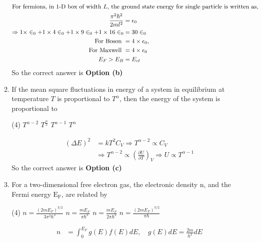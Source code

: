 \begin{enumerate}
	\begin{answer}
		\begin{align*}
		\intertext{For fermions, in 1-D box of width $L$, the ground state energy for single particle is written as,}
		\frac{\pi^{2} \hbar^{2}}{2 m l^{2}}&=\epsilon_{0}\\
		\Rightarrow 1 \times \in_{0}+1 \times 4 \in_{0}+1 \times 9 \in_{0}+1 \times 16 \in_{0}&=30 \in_{0}\\
		\text{ For Boson }&=4 \times \epsilon_{0},\\\text{ For Maxwell }&=4 \times \epsilon_{0}\\
		E_{F}>E_{B}&=E_{c l}
		\end{align*}
		So the correct answer is \textbf{Option (b)}
	\end{answer}
	\item If the mean square fluctuations in energy of a system in equilibrium at temperature $T$ is proportional to $T^{\alpha}$, then the energy of the system is proportional to
	{}
	\begin{tasks}(4)
		\task[\textbf{a.}] $T^{\alpha-2}$
		\task[\textbf{b.}] $T^{\frac{\alpha}{2}}$
		\task[\textbf{c.}] $T^{\alpha-1}$
		\task[\textbf{d.}] $T^{\alpha}$
	\end{tasks}
\begin{answer}
	\begin{align*}
	(\Delta E)^{2}&=k T^{2} C_{V} \Rightarrow T^{\alpha-2} \propto C_{V} \\&\Rightarrow T^{\alpha-2} \propto\left(\frac{\partial U}{\partial T}\right)_{V} \Rightarrow U \propto T^{\alpha-1}
	\end{align*}
	So the correct answer is \textbf{Option (c)}
\end{answer}
	\item For a two-dimensional free electron gas, the electronic density $\mathrm{n}$, and the Fermi energy $\mathrm{E}_{\mathrm{F}}$, are related by
	{}
	\begin{tasks}(4)
		\task[\textbf{a.}] $n=\frac{\left(2 m E_{F}\right)^{3 / 2}}{3 \pi^{2} \hbar^{3}}$
		\task[\textbf{b.}] $n=\frac{m E_{F}}{\pi \hbar^{2}}$
		\task[\textbf{c.}] $n=\frac{m E_{F}}{2 \pi \hbar^{2}}$
		\task[\textbf{d.}] $n=\frac{\left(2 m E_{F}\right)^{3 / 2}}{\pi \hbar}$
	\end{tasks}
	\begin{answer}
		\begin{align*}
		n&=\int_{0}^{E_{F}} g(E) f(E) d E, \quad g(E) d E=\frac{2 m}{h^{2}} d E\\

\end{align*}
\end{answer}
\end{enumerate}
